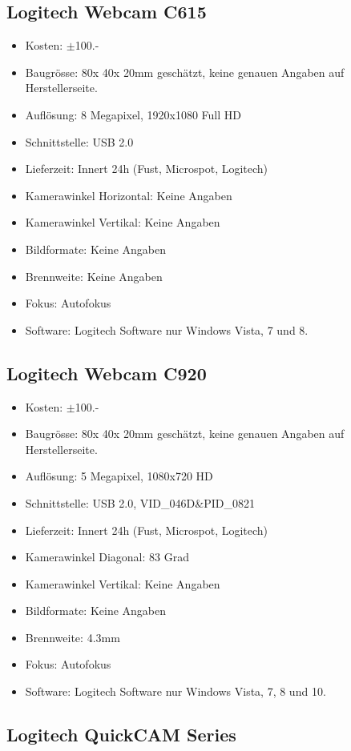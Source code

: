 \subsection{Logitech Webcam C615}
\begin{itemize}
\item Kosten: $\pm$100.-
\item Baugrösse: 80x 40x 20mm geschätzt, keine genauen Angaben auf Herstellerseite.
\item Auflösung: 8 Megapixel, 1920x1080 Full HD
\item Schnittstelle: USB 2.0
\item Lieferzeit: Innert 24h (Fust, Microspot, Logitech)
\item Kamerawinkel Horizontal: Keine Angaben
\item Kamerawinkel Vertikal: Keine Angaben
\item Bildformate: Keine Angaben
\item Brennweite: Keine Angaben
\item Fokus: Autofokus
\item Software: Logitech Software nur Windows Vista, 7 und 8.
\end{itemize}
\subsection{Logitech Webcam C920}
\begin{itemize}
\item Kosten: $\pm$100.-
\item Baugrösse: 80x 40x 20mm geschätzt, keine genauen Angaben auf Herstellerseite.
\item Auflösung: 5 Megapixel, 1080x720 HD
\item Schnittstelle: USB 2.0, VID\_046D{\&}PID\_0821
\item Lieferzeit: Innert 24h (Fust, Microspot, Logitech)
\item Kamerawinkel Diagonal: 83 Grad
\item Kamerawinkel Vertikal: Keine Angaben
\item Bildformate: Keine Angaben
\item Brennweite: 4.3mm
\item Fokus: Autofokus
\item Software: Logitech Software nur Windows Vista, 7, 8 und 10.
\end{itemize}
\subsection{Logitech QuickCAM Series}
